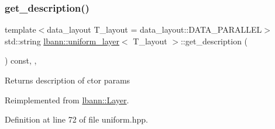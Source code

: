 \subsubsection{\texorpdfstring{get\+\_\+description()}{get\_description()}}
{\footnotesize\ttfamily template$<$data\+\_\+layout T\+\_\+layout = data\+\_\+layout\+::\+D\+A\+T\+A\+\_\+\+P\+A\+R\+A\+L\+L\+EL$>$ \\
std\+::string \hyperlink{classlbann_1_1uniform__layer}{lbann\+::uniform\+\_\+layer}$<$ T\+\_\+layout $>$\+::get\+\_\+description (\begin{DoxyParamCaption}{ }\end{DoxyParamCaption}) const\hspace{0.3cm}{\ttfamily [inline]}, {\ttfamily [override]}, {\ttfamily [virtual]}}

Returns description of ctor params 

Reimplemented from \hyperlink{classlbann_1_1Layer_acc0803d3428914ca1eb5988c4309174a}{lbann\+::\+Layer}.



Definition at line 72 of file uniform.\+hpp.


